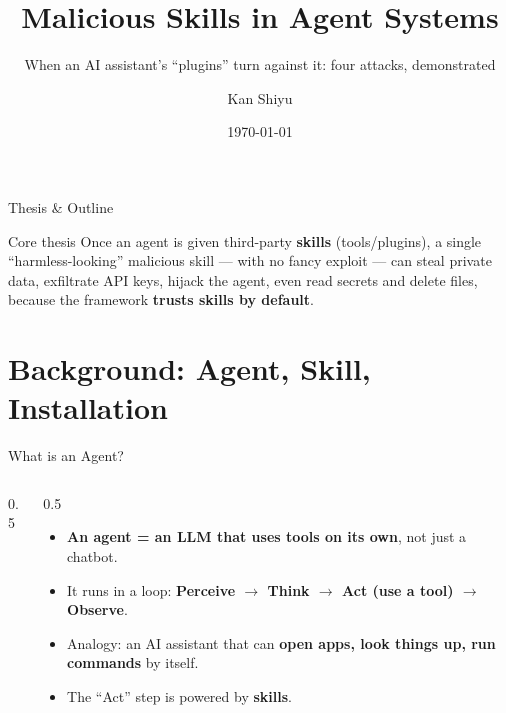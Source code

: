 \documentclass[aspectratio=169,10pt,fontset=fandol]{ctexbeamer}
\title[Malicious Skills]{Malicious Skills in Agent Systems}
\subtitle{When an AI assistant's ``plugins'' turn against it: four attacks, demonstrated}
\author{Kan Shiyu}
\institute[SJTU]{Shanghai Jiao Tong University}
\date{\today}
\newcommand{\robothead}[1]{\begin{scope}[scale=#1]
  \draw[rounded corners=3pt,fill=vblue!15,thick] (-0.6,-0.5) rectangle (0.6,0.6);
  \fill[vblue] (-0.24,0.12) circle (0.08);\fill[vblue] (0.24,0.12) circle (0.08);
  \draw[thick] (-0.28,-0.22)--(0.28,-0.22);
  \draw[thick] (0,0.6)--(0,0.86);\fill[vred] (0,0.92) circle (0.07);
\end{scope}}
\begin{document}
\begin{frame}[plain]\titlepage\end{frame}

\begin{frame}{Thesis \& Outline}
  \begin{block}{Core thesis}
    Once an agent is given third-party \textbf{skills} (tools/plugins), \alert{a single ``harmless-looking'' malicious skill}
    --- with no fancy exploit --- can steal private data, exfiltrate API keys, hijack the agent, even read secrets and delete files,
    because the framework \textbf{trusts skills by default}.
  \end{block}
  \vfill\tableofcontents
\end{frame}

\section{Background: Agent, Skill, Installation}

\begin{frame}{What is an Agent?}
\begin{columns}
\begin{column}{0.5\textwidth}
  \begin{center}\end{center}
\end{column}
\begin{column}{0.5\textwidth}
  \begin{itemize}[<+->]
    \item \textbf{An agent = an LLM that uses tools on its own}, not just a chatbot.
    \item It runs in a loop: \textbf{Perceive $\to$ Think $\to$ Act (use a tool) $\to$ Observe}.
    \item Analogy: an AI assistant that can \textbf{open apps, look things up, run commands} by itself.
    \item The ``Act'' step is powered by \textbf{skills}.
  \end{itemize}
\end{column}
\end{columns}
\end{frame}
\end{document}
